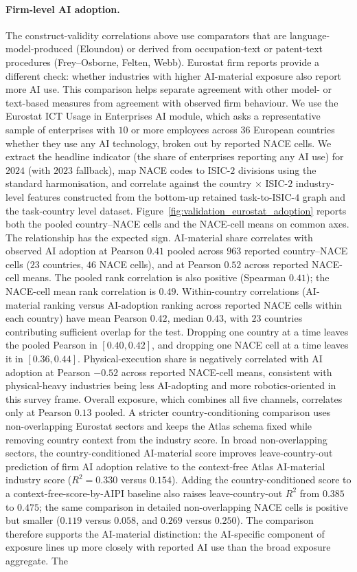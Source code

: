 \documentclass[11pt]{article}
\begin{document}
\paragraph{Firm-level AI adoption.} The construct-validity correlations above use comparators that are language-model-produced (Eloundou) or derived from occupation-text or patent-text procedures (Frey--Osborne, Felten, Webb). Eurostat firm reports provide a different check: whether industries with higher AI-material exposure also report more AI use. This comparison helps separate agreement with other model- or text-based measures from agreement with observed firm behaviour. We use the Eurostat ICT Usage in Enterprises AI module, which asks a representative sample of enterprises with $10$ or more employees across $36$ European countries whether they use any AI technology, broken out by reported NACE cells. We extract the headline indicator (the share of enterprises reporting any AI use) for $2024$ (with $2023$ fallback), map NACE codes to ISIC-$2$ divisions using the standard harmonisation, and correlate against the country $\times$ ISIC-$2$ industry-level features constructed from the bottom-up retained task-to-ISIC-$4$ graph and the task-country level dataset. Figure~\ref{fig:validation_eurostat_adoption} reports both the pooled country--NACE cells and the NACE-cell means on common axes. The relationship has the expected sign. AI-material share correlates with observed AI adoption at Pearson $0.41$ pooled across $963$ reported country--NACE cells ($23$ countries, $46$ NACE cells), and at Pearson $0.52$ across reported NACE-cell means. The pooled rank correlation is also positive (Spearman $0.41$); the NACE-cell mean rank correlation is $0.49$. Within-country correlations (AI-material ranking versus AI-adoption ranking across reported NACE cells within each country) have mean Pearson $0.42$, median $0.43$, with $23$ countries contributing sufficient overlap for the test. Dropping one country at a time leaves the pooled Pearson in $[0.40,0.42]$, and dropping one NACE cell at a time leaves it in $[0.36,0.44]$. Physical-execution share is negatively correlated with AI adoption at Pearson $-0.52$ across reported NACE-cell means, consistent with physical-heavy industries being less AI-adopting and more robotics-oriented in this survey frame. Overall exposure, which combines all five channels, correlates only at Pearson $0.13$ pooled. A stricter country-conditioning comparison uses non-overlapping Eurostat sectors and keeps the Atlas schema fixed while removing country context from the industry score. In broad non-overlapping sectors, the country-conditioned AI-material score improves leave-country-out prediction of firm AI adoption relative to the context-free Atlas AI-material industry score ($R^2=0.330$ versus $0.154$). Adding the country-conditioned score to a context-free-score-by-AIPI baseline also raises leave-country-out $R^2$ from $0.385$ to $0.475$; the same comparison in detailed non-overlapping NACE cells is positive but smaller ($0.119$ versus $0.058$, and $0.269$ versus $0.250$). The comparison therefore supports the AI-material distinction: the AI-specific component of exposure lines up more closely with reported AI use than the broad exposure aggregate. The 
\end{document}
